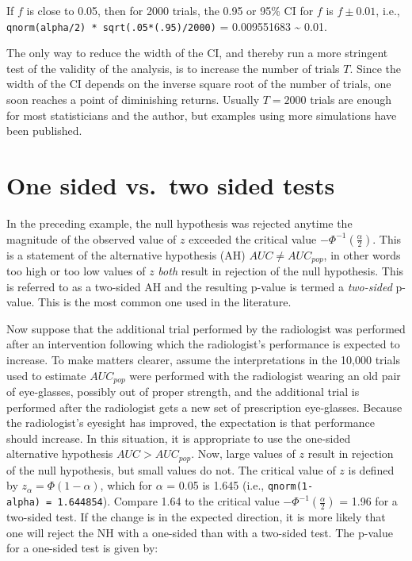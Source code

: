 \documentclass[
]{book}
\begin{document}
If \(f\) is close to 0.05, then for 2000 trials, the 0.95 or 95\% CI for \(f\) is \(f \pm 0.01\), i.e., \texttt{qnorm(alpha/2)\ *\ sqrt(.05*(.95)/2000)} = 0.009551683 \textasciitilde{} 0.01.

The only way to reduce the width of the CI, and thereby run a more stringent test of the validity of the analysis, is to increase the number of trials \(T\). Since the width of the CI depends on the inverse square root of the number of trials, one soon reaches a point of diminishing returns. Usually \(T = 2000\) trials are enough for most statisticians and the author, but examples using more simulations have been published.

\hypertarget{one-sided-vs.-two-sided-tests}{%
\section{One sided vs.~two sided tests}\label{one-sided-vs.-two-sided-tests}}

In the preceding example, the null hypothesis was rejected anytime the magnitude of the observed value of \(z\) exceeded the critical value \(-\Phi^{-1}\left ( \frac{\alpha}{2} \right)\). This is a statement of the alternative hypothesis (AH) \(AUC\neq AUC_{pop}\), in other words too high or too low values of \(z\) \emph{both} result in rejection of the null hypothesis. This is referred to as a two-sided AH and the resulting p-value is termed a \emph{two-sided} p-value. This is the most common one used in the literature.

Now suppose that the additional trial performed by the radiologist was performed after an intervention following which the radiologist's performance is expected to increase. To make matters clearer, assume the interpretations in the 10,000 trials used to estimate \(AUC_{pop}\) were performed with the radiologist wearing an old pair of eye-glasses, possibly out of proper strength, and the additional trial is performed after the radiologist gets a new set of prescription eye-glasses. Because the radiologist's eyesight has improved, the expectation is that performance should increase. In this situation, it is appropriate to use the one-sided alternative hypothesis \(AUC > AUC_{pop}\). Now, large values of \(z\) result in rejection of the null hypothesis, but small values do not. The critical value of \(z\) is defined by \(z_\alpha = \Phi\left ( 1-\alpha \right )\), which for \(\alpha\) = 0.05 is 1.645 (i.e., \texttt{qnorm(1-alpha)\ =\ 1.644854}). Compare 1.64 to the critical value \(-\Phi^{-1}\left ( \frac{\alpha}{2} \right)\) = 1.96 for a two-sided test. If the change is in the expected direction, it is more likely that one will reject the NH with a one-sided than with a two-sided test. The p-value for a one-sided test is given by:
\end{document}
